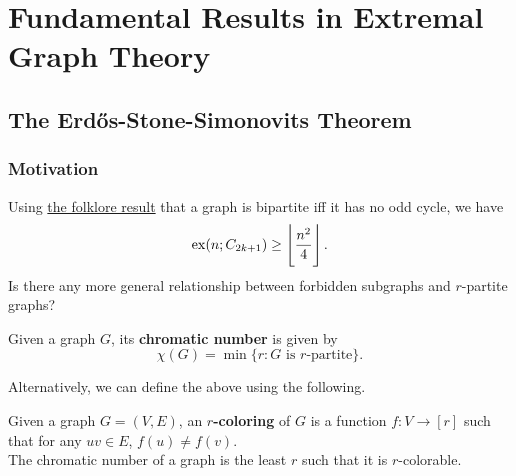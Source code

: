 \documentclass{article}
\begin{document}
\thispagestyle{empty}

\titleBC
\tableofcontents
\clearpage

\setcounter{section}{-1}




\section{Fundamental Results in Extremal Graph Theory}


	\subsection{The Erd\H{o}s-Stone-Simonovits Theorem}

		\subsubsection{Motivation}

			Using \href{https://proofwiki.org/wiki/Graph_is_Bipartite_iff_No_Odd_Cycles}{the folklore result} that a graph is bipartite iff it has no odd cycle, we have
			\[ \operatorname{ex}(n;C_{2k+1}) \ge \left\lfloor \frac{n^2}{4} \right\rfloor. \]
			Is there any more general relationship between forbidden subgraphs and $r$-partite graphs?

			\begin{fdef}
				\label{def: chromatic number}
				Given a graph $G$, its \textbf{chromatic number} is given by
				\[ \chi(G) = \min\{r : G\text{ is $r$-partite}\}. \]
			\end{fdef}

			Alternatively, we can define the above using the following.

			\begin{fdef}
				\label{def: r-coloring}
				Given a graph $G=(V,E)$, an \textbf{$r$-coloring} of $G$ is a function $f : V \to [r]$ such that for any $uv\in E$, $f(u) \ne f(v)$.\\
				The chromatic number of a graph is the least $r$ such that it is $r$-colorable.
			\end{fdef}
\end{document}
